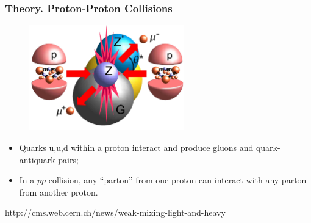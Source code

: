 \begin{frame}\frametitle{Theory. Proton-Proton Collisions}
\begin{figure}[htb]
  \begin{center}
    \includegraphics[width=0.60\textwidth]{../figs/ForPresentation/Theory_ppCollision.png}
  \end{center}
\end{figure}
\scriptsize
\begin{itemize}
  \item Quarks u,u,d within a proton interact and produce gluons and quark-antiquark pairs;
  \item In a $pp$ collision, any ``parton'' from one proton can interact with any parton from another proton.
\end{itemize}
\tiny
http://cms.web.cern.ch/news/weak-mixing-light-and-heavy
\end{frame}%

